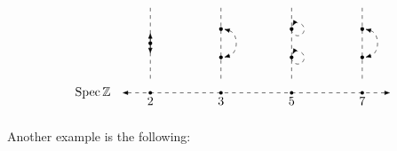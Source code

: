 \[
    \begin{tikzpicture}[>=Latex, scale=1]
    
        \draw[dashed, <->] (-0.8,0) -- (6.8,0);
        \node[left] at (-1.0,0) {$\Spec \Z$};
    
        \foreach \x/\p in {0/2, 2/3, 4/5, 6/7} {
            \fill (\x,0) circle (1.4pt);
            \node[below] at (\x,0) {$\p$};
        }
    
        \draw[dashed] (0,0.4) -- (0,2.4);
        \fill (0,1.4) circle (1.5pt);
        \draw[->] (0,1.4) -- (0,1.7);
        \draw[->] (0,1.4) -- (0,1.1);
    
        \draw[dashed] (2,0.4) -- (2,2.4);
        \fill (2,1.8) circle (1.5pt);
        \fill (2,1.0) circle (1.5pt);
        \draw[dashed, <->]
            (2.08,1.8)
            .. controls (2.50,1.68) and (2.50,1.12) ..
            (2.08,1.0);
    
        \draw[dashed] (4,0.4) -- (4,2.4);
        \fill (4,1.8) circle (1.5pt);
        \fill (4,1.0) circle (1.5pt);
        \draw[dashed, <-] (4.02,1.88) arc[start angle=150,end angle=-210,radius=0.18];
        \draw[dashed, <-] (4.02,1.08) arc[start angle=150,end angle=-210,radius=0.18];
    
        \draw[dashed] (6,0.4) -- (6,2.4);
        \fill (6,1.8) circle (1.5pt);
        \fill (6,1.0) circle (1.5pt);
        \draw[dashed, <->]
            (6.08,1.8)
            .. controls (6.50,1.68) and (6.50,1.12) ..
            (6.08,1.0);
      
    \end{tikzpicture}
\]

Another example is the following:

